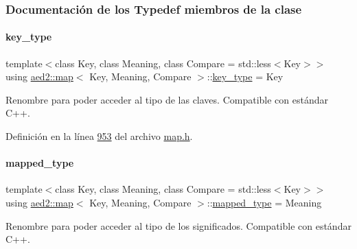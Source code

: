 \subsubsection{Documentación de los \textquotesingle{}Typedef\textquotesingle{} miembros de la clase}
\mbox{\label{classaed2_1_1map_a4273e8812e7105a618df58a2c8b72b7d_a4273e8812e7105a618df58a2c8b72b7d}} 
\paragraph{\texorpdfstring{key\+\_\+type}{key\_type}}
{\footnotesize\ttfamily template$<$class Key, class Meaning, class Compare = std\+::less$<$\+Key$>$$>$ \\
using \hyperlink{classaed2_1_1map}{aed2\+::map}$<$ Key, Meaning, Compare $>$\+::\hyperlink{classaed2_1_1map_a4273e8812e7105a618df58a2c8b72b7d_a4273e8812e7105a618df58a2c8b72b7d}{key\+\_\+type} =  Key}



Renombre para poder acceder al tipo de las claves. Compatible con estándar C++. 



Definición en la línea \hyperlink{map_8h_source_l00953}{953} del archivo \hyperlink{map_8h_source}{map.\+h}.

\mbox{\label{classaed2_1_1map_aa3e34bf624f3009884a71b18f4ddae40_aa3e34bf624f3009884a71b18f4ddae40}} 
\paragraph{\texorpdfstring{mapped\+\_\+type}{mapped\_type}}
{\footnotesize\ttfamily template$<$class Key, class Meaning, class Compare = std\+::less$<$\+Key$>$$>$ \\
using \hyperlink{classaed2_1_1map}{aed2\+::map}$<$ Key, Meaning, Compare $>$\+::\hyperlink{classaed2_1_1map_aa3e34bf624f3009884a71b18f4ddae40_aa3e34bf624f3009884a71b18f4ddae40}{mapped\+\_\+type} =  Meaning}



Renombre para poder acceder al tipo de los significados. Compatible con estándar C++. 



